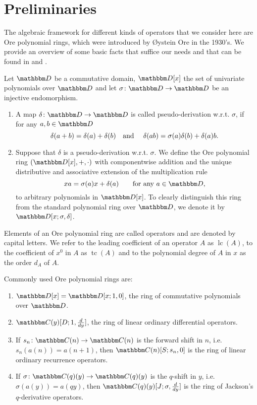 \documentclass[3p,11pt,preprint]{elsarticle}
\let\set\mathbbm
\def\k{\set D}
\newcommand{\D}{x}
\newcommand{\alg}{\k[\D;\sigma,\delta]}
\newcommand{\lc}{\operatorname{lc}}
\newcommand{\cc}{\operatorname{tc}}
\begin{document}
\section{Preliminaries}
\label{prelimsec}

The algebraic framework for different kinds of operators that we consider here are Ore polynomial rings, which were introduced by \O ystein Ore in the 1930's. We provide an overview of some basic facts that suffice our needs and that can be found in \citet{ore} and \citet{bronstein}.
\begin{definition}
Let $\k$ be a commutative domain, $\k[\D]$ the set of univariate polynomials over $\k$ and let $\sigma\colon \k\rightarrow \k$ be an injective endomorphism.
\begin{enumerate}
 \item  A map $\delta\colon \k\rightarrow \k$ is called pseudo-derivation w.r.t. $\sigma$, if for any $a,b\in \k$ 
\begin{displaymath}
 \delta(a+b) = \delta(a) + \delta(b)\text{\quad and \quad} \delta(ab) = \sigma(a)\delta(b) + \delta(a)b.
\end{displaymath}
 \item Suppose that $\delta$ is a pseudo-derivation w.r.t. $\sigma$. We define the Ore polynomial ring $(\k[\D],+,\cdot)$ with componentwise addition and the unique distributive and associative extension of the multiplication rule
\begin{displaymath}
 \D a = \sigma(a)\D+\delta(a)\text{\qquad for any }a\in\k,
\end{displaymath}
 to arbitrary polynomials in $\k[\D]$. To clearly distinguish this ring from the standard polynomial ring over $\k$, we denote it by $\alg$.
\end{enumerate}
\end{definition}

 Elements of an Ore polynomial ring are called operators and are denoted by capital letters. We refer to the leading coefficient of an operator $A$ as $\lc(A)$, to the coefficient of $\D^0$ in $A$ as $\cc(A)$ and to the polynomial degree of $A$ in $x$ as the order $d_A$ of $A$. 

\begin{example}
\label{oreex} Commonly used Ore polynomial rings are:
 \begin{enumerate}
  \item $\k[\D]=\k[\D;1,0]$, the ring of commutative polynomials over $\k$.
  \item $\set C(y)[D;1,\frac{d}{dy}]$, the ring of linear ordinary differential operators.
  \item If $s_n\colon\set C(n)\rightarrow \set C(n)$ is the forward shift in $n$, i.e. $s_n(a(n)) = a(n+1)$, then $\set C(n)[S;s_n,0]$ is the ring of linear ordinary recurrence operators.
  \item If $\sigma\colon\set C(q)(y)\rightarrow \set C(q)(y)$ is the $q$-shift in $y$, i.e. $\sigma(a(y)) = a(qy)$, then $\set C(q)(y)[J;\sigma,\frac{d}{dy}]$ is the ring of Jackson's $q$-derivative operators.
 \end{enumerate}
\end{example}
\end{document}
